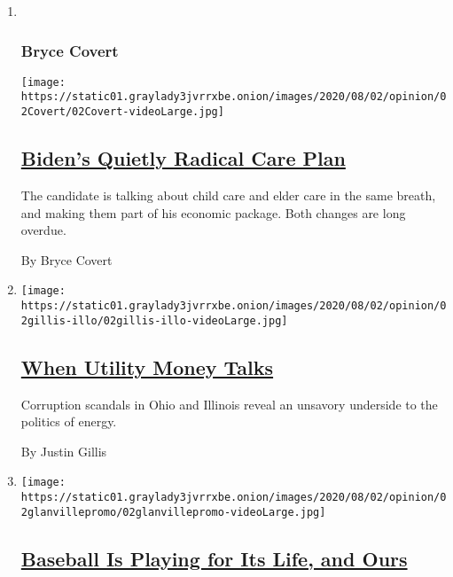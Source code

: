 \begin{enumerate}
\def\labelenumi{\arabic{enumi}.}
\item ~
  \hypertarget{bryce-covert}{%
  \subsubsection{Bryce Covert}\label{bryce-covert}}

  \texttt{[image: https://static01.graylady3jvrrxbe.onion/images/2020/08/02/opinion/02Covert/02Covert-videoLarge.jpg]}

  \hypertarget{bidens-quietly-radical-care-plan}{%
  \subsection{\texorpdfstring{\href{/2020/08/02/opinion/biden-child-care.html}{Biden's
  Quietly Radical Care
  Plan}}{Biden's Quietly Radical Care Plan}}\label{bidens-quietly-radical-care-plan}}

  The candidate is talking about child care and elder care in the same
  breath, and making them part of his economic package. Both changes are
  long overdue.

  By Bryce Covert
\item
  \texttt{[image: https://static01.graylady3jvrrxbe.onion/images/2020/08/02/opinion/02gillis-illo/02gillis-illo-videoLarge.jpg]}

  \hypertarget{when-utility-money-talks}{%
  \subsection{\texorpdfstring{\href{/2020/08/02/opinion/utility-corruption-energy.html}{When
  Utility Money
  Talks}}{When Utility Money Talks}}\label{when-utility-money-talks}}

  Corruption scandals in Ohio and Illinois reveal an unsavory underside
  to the politics of energy.

  By Justin Gillis
\item
  \texttt{[image: https://static01.graylady3jvrrxbe.onion/images/2020/08/02/opinion/02glanvillepromo/02glanvillepromo-videoLarge.jpg]}

  \hypertarget{baseball-is-playing-for-its-life-and-ours}{%
  \subsection{\texorpdfstring{\href{/2020/08/02/opinion/baseball-coronavirus-Marlins.html}{Baseball
  Is Playing for Its Life, and
  Ours}}{Baseball Is Playing for Its Life, and Ours}}\label{baseball-is-playing-for-its-life-and-ours}}


\end{enumerate}
